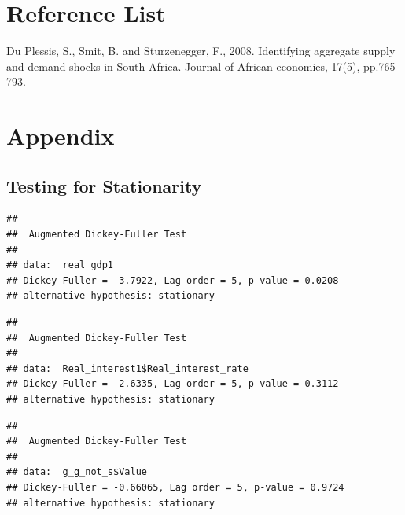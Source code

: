 \documentclass[11pt,preprint, authoryear]{elsarticle}
\numberwithin{equation}{section}
\numberwithin{figure}{section}
\numberwithin{table}{section}
\begin{document}
\hypertarget{reference-list}{%
\section{Reference List}\label{reference-list}}

Du Plessis, S., Smit, B. and Sturzenegger, F., 2008. Identifying
aggregate supply and demand shocks in South Africa. Journal of African
economies, 17(5), pp.765-793.

\hypertarget{appendix}{%
\section{Appendix}\label{appendix}}

\hypertarget{testing-for-stationarity}{%
\subsection{Testing for Stationarity}\label{testing-for-stationarity}}

\begin{verbatim}
## 
##  Augmented Dickey-Fuller Test
## 
## data:  real_gdp1
## Dickey-Fuller = -3.7922, Lag order = 5, p-value = 0.0208
## alternative hypothesis: stationary
\end{verbatim}

\begin{verbatim}
## 
##  Augmented Dickey-Fuller Test
## 
## data:  Real_interest1$Real_interest_rate
## Dickey-Fuller = -2.6335, Lag order = 5, p-value = 0.3112
## alternative hypothesis: stationary
\end{verbatim}

\begin{verbatim}
## 
##  Augmented Dickey-Fuller Test
## 
## data:  g_g_not_s$Value
## Dickey-Fuller = -0.66065, Lag order = 5, p-value = 0.9724
## alternative hypothesis: stationary
\end{verbatim}


\end{document}
